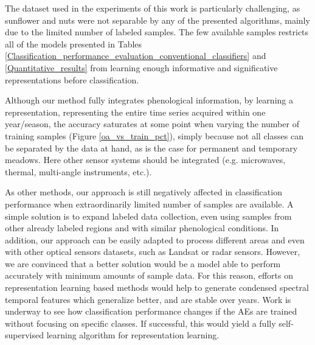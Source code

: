 \documentclass[journal,article,submit,pdftex,moreauthors]{Definitions/mdpi}
\begin{document}


The dataset used in the experiments of this work is particularly challenging, as sunflower and nuts were not separable by any of the presented algorithms, mainly due to the limited number of labeled samples. The few available samples restricts all of the models presented in Tables \ref{Classification_performance_evaluation_conventional_classifiers} and \ref{Quantitative_results} from learning enough informative and significative representations before classification.

Although our method fully integrates phenological information, by learning a representation, representing the entire time series acquired within one year/season, the accuracy saturates at some point when varying the number of training samples (Figure \ref{oa_vs_train_pct}), simply because not all classes can be separated by the data at hand, as is the case for permanent and temporary meadows. Here other sensor systems should be integrated (e.g. microwaves, thermal, multi-angle instruments, etc.).

As other methods, our approach is still negatively affected in classification performance when extraordinarily limited number of samples are available. A simple solution is to expand labeled data collection, even using samples from other already labeled regions and with similar phenological conditions. In addition, our approach can be easily adapted to process different areas and even with other optical sensors datasets, such as Landsat or radar sensors.
However, we are convinced that a better solution would be a model able to perform accurately with minimum amounts of sample data. For this reason, efforts on representation learning based methods would help to generate condensed spectral temporal features which generalize better, and are stable over years. Work is underway to see how classification performance changes if the AEs are trained without focusing on specific classes. If successful, this would yield a fully self-supervised learning algorithm for representation learning.
\end{document}
